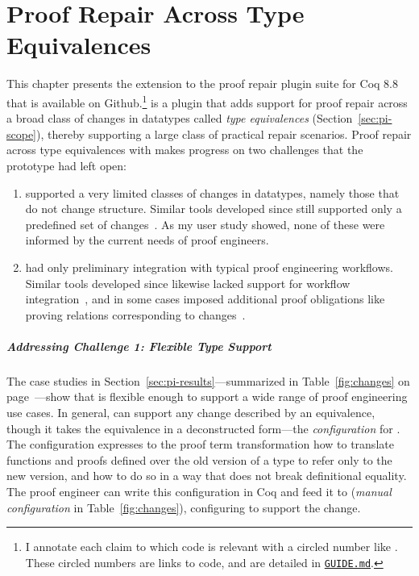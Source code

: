 \chapter{Proof Repair Across Type Equivalences}
\label{chapt:pi}


This chapter presents the \toolnamec extension to the \sysnamelong proof repair plugin suite for Coq 8.8 %
that is available on Github.\footnote{I annotate each claim to which code is relevant with a circled number like . These circled numbers are links to code, and are detailed in \href{https://github.com/uwplse/pumpkin-pi/blob/v2.0.0/GUIDE.md}{\lstinline{GUIDE.md}}.} %
\toolnamec is a plugin that adds support for proof repair across a broad class of changes in datatypes called 
\textit{type equivalences} (Section~\ref{sec:pi-scope}),
thereby supporting a large class of practical repair scenarios.
Proof repair across type equivalences with \toolnamec makes progress on two challenges that the \sysname prototype had left open:

\begin{enumerate}
\item \sysname supported a very limited classes of changes in datatypes, namely those that do not change structure.
Similar tools developed since still supported only a predefined set of changes~\cite{robert2018, wibergh2019}. As my user study showed, none of these were informed by the current needs of proof engineers. %
\item \sysname had only preliminary integration with typical proof engineering workflows.
Similar tools developed since likewise lacked support for workflow integration~\cite{PGL-045, robert2018},
and in some cases imposed additional proof obligations like proving relations corresponding to changes~\cite{tabareau2019marriage}.
\end{enumerate}

\paragraph{Addressing Challenge 1: Flexible Type Support}
The case studies in Section~\ref{sec:pi-results}---summarized in Table~\ref{fig:changes} on page~\pageref{fig:changes}---show that \toolnamec is flexible enough to support
a wide range of proof engineering use cases. %
In general, \toolnamec can support any change described by an equivalence, though it takes the equivalence in a
deconstructed form---the \textit{configuration} for \toolnamec. %
The configuration expresses to the proof term transformation how to translate functions and proofs defined over the old version of a type
to refer only to the new version, and how to do so in a way that does not break definitional equality.
The proof engineer can write this configuration in Coq and feed it to \toolnamec (\textit{manual configuration} in Table~\ref{fig:changes}),
configuring \toolnamec to support the change. %

